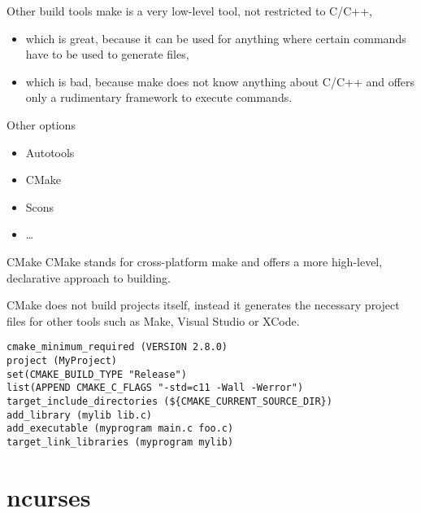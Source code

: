 
\begin{frame}{Other build tools}
	make is a very low-level tool, not restricted to C/C++,
	\begin{itemize}
	  \item which is great, because it can be used for anything where certain commands have to be used to generate files,
	  \item which is bad, because make does not know anything about C/C++ and offers only a rudimentary framework to execute commands.
	\end{itemize}

	Other options
	\begin{itemize}
	  \item Autotools
	  \item CMake
	  \item Scons
	  \item …
	\end{itemize}
\end{frame}


\begin{frame}[fragile]{CMake}
	CMake stands for cross-platform make and offers a more high-level, declarative approach to building.

	CMake does not build projects itself, instead it generates the necessary project files for other tools such as Make, Visual Studio or XCode.

	\begin{lstlisting}[escapeinside=§]
cmake_minimum_required (VERSION 2.8.0)
project (MyProject)
set(CMAKE_BUILD_TYPE "Release")
list(APPEND CMAKE_C_FLAGS "-std=c11 -Wall -Werror")
target_include_directories (${CMAKE_CURRENT_SOURCE_DIR})
add_library (mylib lib.c)
add_executable (myprogram main.c foo.c)
target_link_libraries (myprogram mylib)
    \end{lstlisting}
\end{frame}

\section{ncurses}

